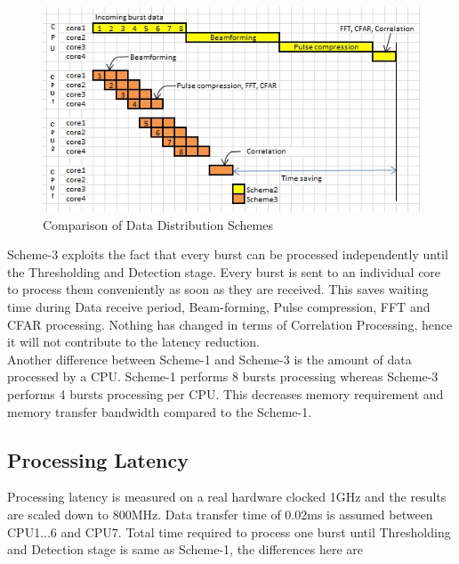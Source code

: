 \begin{figure}[h!]
	\centering
	\includegraphics[]{figures/scheme4_comparison}
	\caption{Comparison of Data Distribution Schemes}
	\label{fig:mm:scheme4_comparison}
\end{figure}

Scheme-3 exploits the fact that every burst can be processed independently until the Thresholding and Detection stage. Every burst is sent to an individual core to process them conveniently as soon as they are received. This saves waiting time during Data receive period, Beam-forming, Pulse compression, FFT and CFAR processing. Nothing has changed in terms of Correlation Processing, hence it will not contribute to the latency reduction.\\[0.2cm]
Another difference between Scheme-1 and Scheme-3 is the amount of data processed by a CPU. Scheme-1 performs 8 bursts processing whereas Scheme-3 performs 4 bursts processing per CPU. This decreases memory requirement and memory transfer bandwidth compared to the Scheme-1.

\subsection{Processing Latency}
\label{ss:mm:scheme4:latency}
Processing latency is measured on a real hardware clocked 1GHz and the results are scaled down to 800MHz. Data transfer time of 0.02ms is assumed between CPU1...6 and CPU7. Total time required to process one burst until Thresholding and Detection stage is same as Scheme-1, the differences here are 

